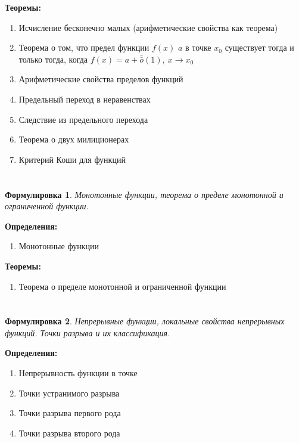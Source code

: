 \documentclass[a4paper]{article}
\newcommand{\om}{\bar{\bar{o}}}
\theoremstyle{plain}
\newtheorem*{st}{Формулировка}
\theoremstyle{definition}
\theoremstyle{remark}
\begin{document}
\textbf{Теоремы:}
\begin{enumerate}
    \item Исчисление бесконечно малых (арифметические свойства как теорема)
    \item Теорема о том, что предел функции $f(x)$ $a$ в точке $x_0$ существует тогда и только тогда, когда $f(x) = a + \om (1), \ x \to x_0$
    \item Арифметические свойства пределов функций
    \item Предельный переход в неравенствах
    \item Следствие из предельного перехода
    \item Теорема о двух милиционерах
    \item Критерий Коши для функций
\end{enumerate}


\section{}
\begin{st}
    Монотонные функции, теорема о пределе монотонной и ограниченной функции.
\end{st}

\textbf{Определения:}
\begin{enumerate}
    \item Монотонные функции
\end{enumerate}

\textbf{Теоремы:}
\begin{enumerate}
    \item Теорема о пределе монотонной и ограниченной функции
\end{enumerate}


\section{}
\begin{st}
    Непрерывные функции, локальные свойства непрерывных функций. Точки разрыва и их классификация.
\end{st}

\textbf{Определения:}
\begin{enumerate}
    \item Непрерывность функции в точке
    \item Точки устранимого разрыва
    \item Точки разрыва первого рода
    \item Точки разрыва второго рода
\end{enumerate}
\end{document}
